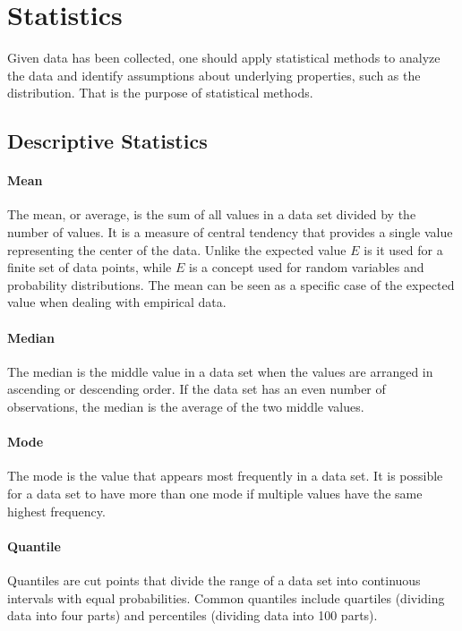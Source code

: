 \chapter{Statistics}\label{Statistics}

Given data has been collected, one should apply statistical methods to analyze the data and identify assumptions about underlying properties, such as the distribution.
That is the purpose of statistical methods.

\section{Descriptive Statistics}\label{Descriptive Statistics}

\subsubsection{Mean}\label{Mean}
The mean, or average, is the sum of all values in a data set divided by the number of values. It is a measure of central tendency that provides a single value representing the center of the data.
Unlike the expected value $E$ is it used for a finite set of data points, while $E$ is a concept used for random variables and probability distributions. The mean can be seen as a specific case of the expected value when dealing with empirical data.

\subsubsection{Median}\label{Median}
The median is the middle value in a data set when the values are arranged in ascending or descending order. If the data set has an even number of observations, the median is the average of the two middle values.

\subsubsection{Mode}\label{Mode}
The mode is the value that appears most frequently in a data set. It is possible for a data set to have more than one mode if multiple values have the same highest frequency.

\subsubsection{Quantile}\label{Quantile}
Quantiles are cut points that divide the range of a data set into continuous intervals with equal probabilities. Common quantiles include quartiles (dividing data into four parts) and percentiles (dividing data into 100 parts).


